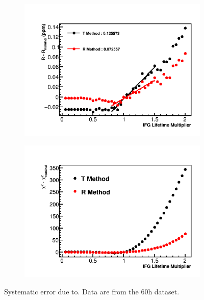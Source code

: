 \begin{figure}[h]
\centering
    \begin{subfigure}[t]{0.45\textwidth}
        \centering
        \includegraphics[width=\textwidth]{IFG_Lifetime_Compare_R}
        \caption{}
    \end{subfigure}%
    \hspace{1cm}
    \begin{subfigure}[t]{0.45\textwidth}
        \centering
        \includegraphics[width=\textwidth]{IFG_Lifetime_Compare_Chisq.png}
        \caption{}
    \end{subfigure}
\caption[Systematic error due to]{Systematic error due to. Data are from the 60h dataset.}
\label{fig:IFGAmpscan}
\end{figure}






